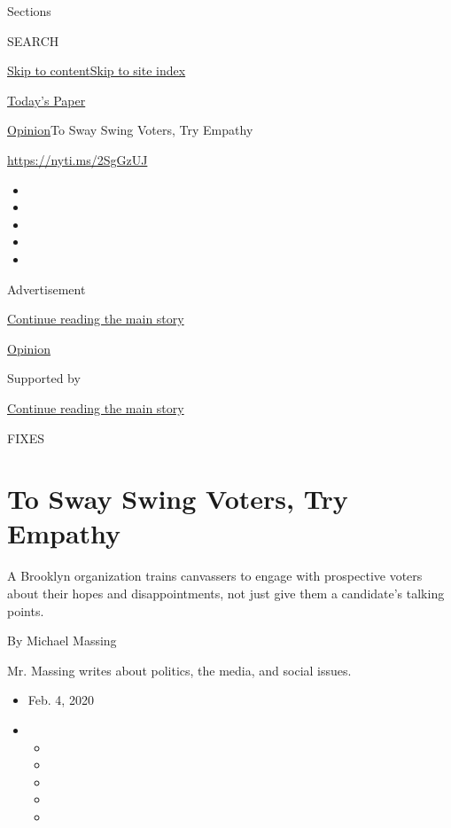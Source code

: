 Sections

SEARCH

\protect\hyperlink{site-content}{Skip to
content}\protect\hyperlink{site-index}{Skip to site index}

\href{https://myaccount.nytimes3xbfgragh.onion/auth/login?response_type=cookie\&client_id=vi}{}

\href{https://www.nytimes3xbfgragh.onion/section/todayspaper}{Today's
Paper}

\href{/section/opinion}{Opinion}\textbar{}To Sway Swing Voters, Try
Empathy

\url{https://nyti.ms/2SgGzUJ}

\begin{itemize}
\item
\item
\item
\item
\item
\end{itemize}

Advertisement

\protect\hyperlink{after-top}{Continue reading the main story}

\href{/section/opinion}{Opinion}

Supported by

\protect\hyperlink{after-sponsor}{Continue reading the main story}

FIXES

\hypertarget{to-sway-swing-voters-try-empathy}{%
\section{To Sway Swing Voters, Try
Empathy}\label{to-sway-swing-voters-try-empathy}}

A Brooklyn organization trains canvassers to engage with prospective
voters about their hopes and disappointments, not just give them a
candidate's talking points.

By Michael Massing

Mr. Massing writes about politics, the media, and social issues.

\begin{itemize}
\item
  Feb. 4, 2020
\item
  \begin{itemize}
  \item
  \item
  \item
  \item
  \item
  \end{itemize}
\end{itemize}

